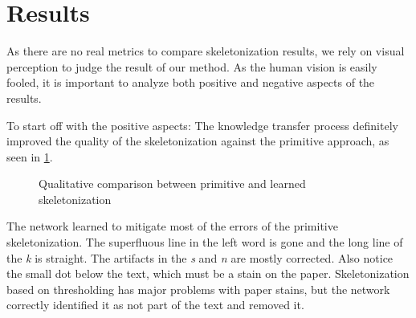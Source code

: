 \section{Results}


As there are no real metrics to compare skeletonization results, we rely on visual perception to judge the result of our method. As the human vision is easily fooled, it is important to analyze both positive and negative aspects of the results.

To start off with the positive aspects: The knowledge transfer process definitely improved the quality of the skeletonization against the primitive approach, as seen in \cref{fig:skeletonizationQualitativeComparison}.


\begin{figure}[H]
  \centering
  \caption[Qualitative comparison between primitive and learned skeletonization]{Qualitative comparison between primitive and learned skeletonization}
  \label{fig:skeletonizationQualitativeComparison}
\end{figure}

The network learned to mitigate most of the errors of the primitive skeletonization. The superfluous line in the left word is gone and the long line of the \emph{k} is straight. The artifacts in the \emph{s} and \emph{n} are mostly corrected. Also notice the small dot below the text, which must be a stain on the paper. Skeletonization based on thresholding has major problems with paper stains, but the network correctly identified it as not part of the text and removed it.

